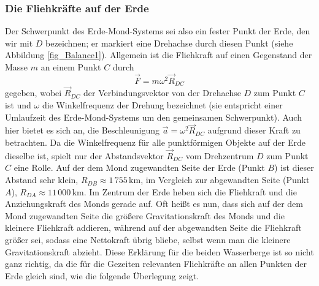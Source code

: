 \subsubsection{Die Fliehkr\"afte auf der Erde}

Der Schwerpunkt des Erde-Mond-Systems sei also ein fester Punkt der Erde, den wir mit
$D$ bezeichnen; er markiert eine Drehachse durch diesen Punkt (siehe Abbildung \ref{fig_Balance1}).   
Allgemein ist die Fliehkraft auf einen Gegenstand der Masse $m$ an einem Punkt $C$ durch
\begin{equation}
                 \vec{F} = m \omega^2 \vec{R}_{DC} 
\end{equation}
gegeben, wobei $\vec{R}_{DC}$ der Verbindungsvektor von der Drehachse $D$ zum Punkt $C$ ist und
$\omega$ die Winkelfrequenz der Drehung bezeichnet (sie entspricht einer Umlaufzeit des
Erde-Mond-Systems um den gemeinsamen Schwerpunkt).
Auch hier bietet es sich an, die Beschleunigung $\vec{a}=\omega^2\vec{R}_{DC}$
aufgrund dieser Kraft zu betrachten. Da die Winkelfrequenz f\"ur alle 
punktf\"ormigen Objekte auf der Erde dieselbe
ist, spielt nur der Abstandsvektor $\vec{R}_{DC}$ vom Drehzentrum $D$ zum Punkt $C$ eine Rolle. 
Auf der dem Mond zugewandten Seite der Erde (Punkt $B$) ist dieser Abstand sehr klein, 
$R_{DB} \approx 1\,755$\,km, im Vergleich zur abgewandten Seite (Punkt $A$), 
$R_{DA}\approx 11\,000$\,km. Im Zentrum der Erde heben sich die
Fliehkraft und die Anziehungskraft des Monds gerade auf. Oft hei\ss t es nun, dass sich auf der dem 
Mond zugewandten Seite die gr\"o\ss ere Gravitationskraft des Monds und die kleinere Fliehkraft addieren, 
w\"ahrend auf der abgewandten Seite die Fliehkraft gr\"o\ss er sei, sodass eine Nettokraft \"ubrig bliebe, 
selbst wenn man die kleinere Gravitationskraft abzieht. Diese Erkl\"arung f\"ur die beiden
Wasserberge ist so nicht ganz richtig, da die f\"ur die Gezeiten relevanten Fliehkr\"afte an allen Punkten
der Erde gleich sind, wie die folgende \"Uberlegung zeigt. 

